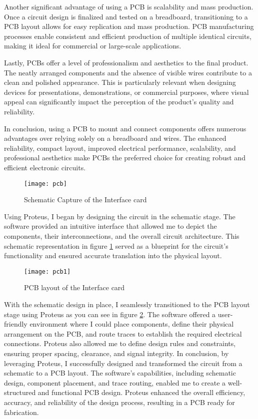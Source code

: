 Another significant advantage of using a PCB is scalability and mass production. Once a circuit design is finalized and tested on a breadboard, transitioning to a PCB layout allows for easy replication and mass production. PCB manufacturing processes enable consistent and efficient production of multiple identical circuits, making it ideal for commercial or large-scale applications.\cite{And}

Lastly, PCBs offer a level of professionalism and aesthetics to the final product. The neatly arranged components and the absence of visible wires contribute to a clean and polished appearance. This is particularly relevant when designing devices for presentations, demonstrations, or commercial purposes, where visual appeal can significantly impact the perception of the product's quality and reliability.\cite{And}

In conclusion, using a PCB to mount and connect components offers numerous advantages over relying solely on a breadboard and wires. The enhanced reliability, compact layout, improved electrical performance, scalability, and professional aesthetics make PCBs the preferred choice for creating robust and efficient electronic circuits.
\begin{figure}[h]
\FloatBarrier
         \centering
        \texttt{[image: pcb]}
   
        \caption{Schematic Capture of the Interface card}
        \label{Schematic Capture of the Interface card}
\FloatBarrier
    \end{figure}
\FloatBarrier
Using Proteus, I began by designing the circuit in the schematic stage. The software provided an intuitive interface that allowed me to depict the components, their interconnections, and the overall circuit architecture. This schematic representation in figure \ref{Schematic Capture of the Interface card} served as a blueprint for the circuit's functionality and ensured accurate translation into the physical layout.
\begin{figure}[h]
\FloatBarrier
         \centering
        \texttt{[image: pcb1]}
   
        \caption{PCB layout of the Interface card}
        \label{PCB layout of the Interface card}
\FloatBarrier
    \end{figure}
\FloatBarrier

With the schematic design in place, I seamlessly transitioned to the PCB layout stage using Proteus as you can see in figure \ref{PCB layout of the Interface card}. The software offered a user-friendly environment where I could place components, define their physical arrangement on the PCB, and route traces to establish the required electrical connections. Proteus also allowed me to define design rules and constraints, ensuring proper spacing, clearance, and signal integrity.
In conclusion, by leveraging Proteus, I successfully designed and transformed the circuit from a schematic to a PCB layout. The software's capabilities, including schematic design, component placement, and trace routing, enabled me to create a well-structured and functional PCB design. Proteus enhanced the overall efficiency, accuracy, and reliability of the design process, resulting in a PCB ready for fabrication.

